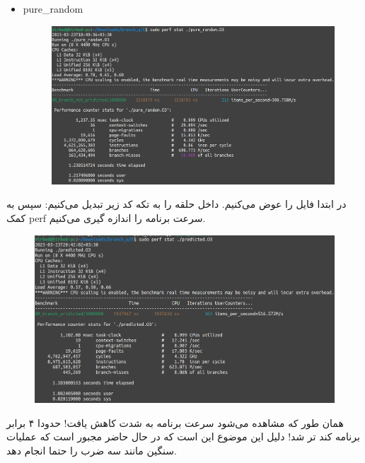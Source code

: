\begin{enumerate}
\begin{latin}
\begin{itemize}
\begin{figure}[H]
        \end{figure}
        \item pure\_random
        \begin{figure}[H]
            \centerline{\includegraphics[scale=0.35]{pics/5/E/pure_random.png}}
        \end{figure}
    \end{itemize}
    \end{latin}
    در ابتدا فایل 
    را عوض می‌کنیم. داخل حلقه را به تکه کد زیر تبدیل می‌کنیم:
    سپس به کمک perf
    سرعت برنامه را اندازه گیری می‌کنیم.
    \begin{figure}[H]
        \centerline{\includegraphics[scale=0.35]{pics/5/E/predicted_no_branch.png}}
    \end{figure}
    همان طور که مشاهده می‌شود سرعت برنامه به شدت کاهش یافت! حدودا ۴ برابر برنامه کند تر شد!
    دلیل این موضوع این است که در حال حاضر
    مجبور است که عملیات سنگین مانند سه ضرب را حتما انجام دهد.


\end{enumerate}
